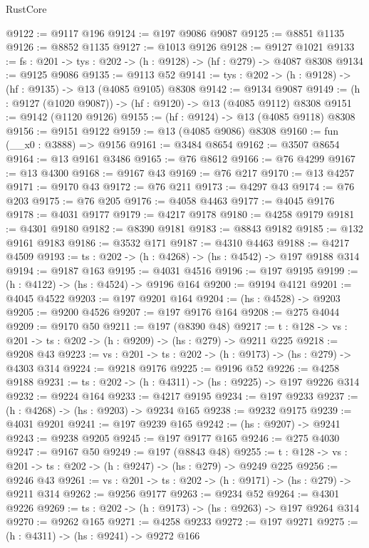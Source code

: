 \begin{lexlean}{RustCore}
\begin{coremodule}
@9122 := @9117 @196
@9124 := @197 @9086 @9087
@9125 := @8851 @1135
@9126 := @8852 @1135
@9127 := @1013 @9126
@9128 := @9127 @1021
@9133 := {fs : @201} -> {tys : @202} -> (h : @9128) -> (hf : @279) -> @4087 @8308
@9134 := @9125 @9086
@9135 := @9113 @52
@9141 := {tys : @202} -> (h : @9128) -> (hf : @9135) -> @13 (@4085 @9105) @8308
@9142 := @9134 @9087
@9149 := (h : @9127 (@1020 @9087)) -> (hf : @9120) -> @13 (@4085 @9112) @8308
@9151 := @9142 (@1120 @9126)
@9155 := (hf : @9124) -> @13 (@4085 @9118) @8308
@9156 := @9151 @9122
@9159 := @13 (@4085 @9086) @8308
@9160 := fun (__x0 : @3888) => @9156
@9161 := @3484 @8654
@9162 := @3507 @8654
@9164 := @13 @9161 @3486
@9165 := @76 @8612
@9166 := @76 @4299
@9167 := @13 @4300
@9168 := @9167 @43
@9169 := @76 @217
@9170 := @13 @4257
@9171 := @9170 @43
@9172 := @76 @211
@9173 := @4297 @43
@9174 := @76 @203
@9175 := @76 @205
@9176 := @4058 @4463
@9177 := @4045 @9176
@9178 := @4031 @9177
@9179 := @4217 @9178
@9180 := @4258 @9179
@9181 := @4301 @9180
@9182 := @8390 @9181
@9183 := @8843 @9182
@9185 := @132 @9161 @9183
@9186 := @3532 @171
@9187 := @4310 @4463
@9188 := @4217 @4509
@9193 := {ts : @202} -> (h : @4268) -> (hs : @4542) -> @197 @9188 @314
@9194 := @9187 @163
@9195 := @4031 @4516
@9196 := @197 @9195
@9199 := (h : @4122) -> (hs : @4524) -> @9196 @164
@9200 := @9194 @4121
@9201 := @4045 @4522
@9203 := @197 @9201 @164
@9204 := (hs : @4528) -> @9203
@9205 := @9200 @4526
@9207 := @197 @9176 @164
@9208 := @275 @4044
@9209 := @9170 @50
@9211 := @197 (@8390 @48)
@9217 := {t : @128} -> {vs : @201} -> {ts : @202} -> (h : @9209) -> (hs : @279) -> @9211 @225
@9218 := @9208 @43
@9223 := {vs : @201} -> {ts : @202} -> (h : @9173) -> (hs : @279) -> @4303 @314
@9224 := @9218 @9176
@9225 := @9196 @52
@9226 := @4258 @9188
@9231 := {ts : @202} -> (h : @4311) -> (hs : @9225) -> @197 @9226 @314
@9232 := @9224 @164
@9233 := @4217 @9195
@9234 := @197 @9233
@9237 := (h : @4268) -> (hs : @9203) -> @9234 @165
@9238 := @9232 @9175
@9239 := @4031 @9201
@9241 := @197 @9239 @165
@9242 := (hs : @9207) -> @9241
@9243 := @9238 @9205
@9245 := @197 @9177 @165
@9246 := @275 @4030
@9247 := @9167 @50
@9249 := @197 (@8843 @48)
@9255 := {t : @128} -> {vs : @201} -> {ts : @202} -> (h : @9247) -> (hs : @279) -> @9249 @225
@9256 := @9246 @43
@9261 := {vs : @201} -> {ts : @202} -> (h : @9171) -> (hs : @279) -> @9211 @314
@9262 := @9256 @9177
@9263 := @9234 @52
@9264 := @4301 @9226
@9269 := {ts : @202} -> (h : @9173) -> (hs : @9263) -> @197 @9264 @314
@9270 := @9262 @165
@9271 := @4258 @9233
@9272 := @197 @9271
@9275 := (h : @4311) -> (hs : @9241) -> @9272 @166

\end{coremodule}
\end{lexlean}
